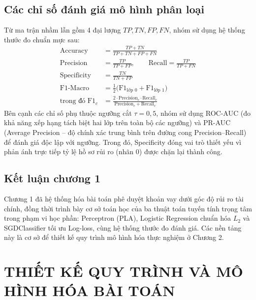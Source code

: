 \documentclass[12pt,a4paper,oneside]{report}
\begin{document}
\section{Các chỉ số đánh giá mô hình phân loại}

Từ ma trận nhầm lẫn gồm 4 đại lượng $TP, TN, FP, FN$, nhóm sử dụng hệ thống thước đo chuẩn mực sau:
\begin{align}
  \text{Accuracy} &= \frac{TP + TN}{TP + TN + FP + FN} \label{eq:acc} \\
  \text{Precision} &= \frac{TP}{TP + FP}, \qquad \text{Recall} = \frac{TP}{TP + FN} \label{eq:pr} \\
  \text{Specificity} &= \frac{TN}{TN + FP} \label{eq:spec} \\
  \text{F1-Macro} &= \frac{1}{2}\Big(\text{F1}_{\text{lớp }0} + \text{F1}_{\text{lớp }1}\Big) \label{eq:f1macro} \\
  \text{trong đó } \text{F1}_c &= \frac{2 \cdot \text{Precision}_c \cdot \text{Recall}_c}{\text{Precision}_c + \text{Recall}_c} \label{eq:f1c}
\end{align}
Bên cạnh các chỉ số phụ thuộc ngưỡng cắt $\tau = 0{,}5$, nhóm sử dụng ROC-AUC (đo khả năng xếp hạng tách biệt hai lớp trên toàn bộ các ngưỡng) và PR-AUC (Average Precision -- độ chính xác trung bình trên đường cong Precision--Recall) để đánh giá độc lập với ngưỡng. Trong đó, Specificity đóng vai trò thiết yếu vì phản ánh trực tiếp tỷ lệ hồ sơ rủi ro (nhãn $0$) được chặn lại thành công.

\section{Kết luận chương 1}

Chương 1 đã hệ thống hóa bài toán phê duyệt khoản vay dưới góc độ rủi ro tài chính, đồng thời trình bày cơ sở toán học của ba thuật toán tuyến tính trọng tâm trong phạm vi học phần: Perceptron (PLA), Logistic Regression chuẩn hóa $L_2$ và SGDClassifier tối ưu Log-loss, cùng hệ thống thước đo đánh giá. Các nền tảng này là cơ sở để thiết kế quy trình mô hình hóa thực nghiệm ở Chương 2.

\chapter{THIẾT KẾ QUY TRÌNH VÀ MÔ HÌNH HÓA BÀI TOÁN}
\end{document}
